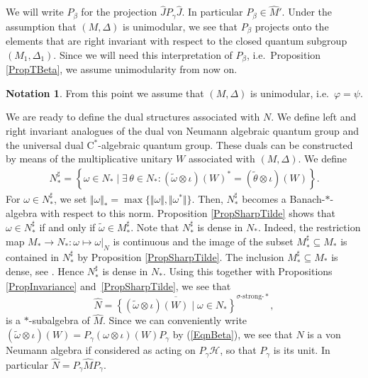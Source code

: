 \documentclass[pdftex]{sigma}
\numberwithin{equation}{section}
\theoremstyle{definition}
\newtheorem{nt}[thm]{Notation}
\newcommand{\cHil}{\mathcal{H}}
\begin{document}
We will write $P_\beta$ for the projection $\hat{J} P_\gamma \hat{J}$. In particular $P_\beta \in \hat{M}'$. Under the assumption that $(M, \Delta)$ is unimodular, we see that $P_\beta$ projects onto the elements that are right invariant with respect to the closed quantum subgroup $(M_1 ,\Delta_1)$. Since we will need this interpretation of $P_\beta$, i.e.\ Proposition \ref{PropTBeta}, we assume unimodularity from now on.

\begin{nt}\label{NtUnimodular}
From this point we assume that $(M, \Delta)$ is unimodular, i.e.\ $\varphi = \psi$.
\end{nt}

We are ready to def\/ine the dual structures associated with $N$. We def\/ine left and right invariant analogues of the dual von Neumann algebraic quantum group and the universal dual C$^\ast$-algebraic quantum group. These duals can be constructed by means of the multiplicative unitary $W$ associated with $(M, \Delta)$. We def\/ine
\begin{gather*}%
N_\ast^\sharp = \left\{\omega \in N_\ast \mid \exists\, \theta \in N_\ast: (\tilde{\omega} \otimes \iota)(W)^\ast = (\tilde{\theta} \otimes \iota)(W) \right\}.
\end{gather*}
For $\omega \in N_\ast^\sharp$, we set $\Vert \omega \Vert_\ast = \max \{ \Vert \omega \Vert, \Vert \omega^\ast \Vert \}$. Then, $N_\ast^\sharp$ becomes a Banach-$\ast$-algebra with respect to this norm. Proposition \ref{PropSharpTilde} shows that $\omega \in N_\ast^\sharp$ if and only if $\tilde{\omega} \in M_\ast^\sharp$. Note that  $N_\ast^\sharp$ is dense in $N_\ast$. Indeed, the restriction map $M_\ast \rightarrow N_\ast: \omega \mapsto \omega\vert_N$  is continuous and the image of the subset $M_\ast^\sharp \subseteq M_\ast$ is contained in $N_\ast^\sharp$ by Proposition \ref{PropSharpTilde}. The inclusion $M_\ast^\sharp  \subseteq M_\ast$ is dense, see  \cite[Lemma 2.5]{KusVaeII}. Hence $N_\ast^\sharp$ is dense in $N_\ast$. Using this together with Propositions \ref{PropInvariance} and~\ref{PropSharpTilde}, we see that
\[
\hat{N} = \overline{\left\{ (\tilde{\omega} \otimes \iota)(W) \mid \omega \in N_\ast \right\}}^{\sigma\text{-strong-}\ast},
\]
is a $\ast$-subalgebra of $\hat{M}$. Since we can conveniently write
$
(\tilde{\omega} \otimes \iota)(W) = P_\gamma (\omega \otimes \iota)(W) P_\gamma
$
by (\ref{EqnBeta}),
 we see that $\hat{N}$ is a von Neumann algebra if considered as acting on $P_\gamma \cHil$, so that $P_\gamma$ is its unit. In particular $\hat{N} = P_\gamma \hat{M} P_\gamma$.
\end{document}
